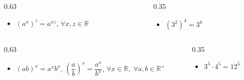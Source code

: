 \documentclass[aspectratio=169]{beamer}
\begin{document}
\begin{frame}[t]
  \vspace{0.14cm}
  \begin{columns}[T,onlytextwidth]
    \begin{column}{0.63\textwidth}
      \begin{minipage}[t][1.75em]{\columnwidth}
        \begin{itemize}
          \item<4-> \((a^x)^z=a^{xz}\), \quad \(\forall x,z\in\mathbb{R}\)
        \end{itemize}
      \end{minipage}
    \end{column}
    \begin{column}{0.35\textwidth}
      \begin{minipage}[c][1.75em]{\columnwidth}
        \begin{itemize}
          \item<5-> \((3^2)^4=3^8\)
        \end{itemize}
      \end{minipage}
    \end{column}
  \end{columns}

  \vspace{0.14cm}
  \begin{columns}[T,onlytextwidth]
    \begin{column}{0.63\textwidth}
      \begin{minipage}[t][4.65em]{\columnwidth}
        \vspace{0.45em}
        \begin{itemize}
          \item<6-> \((ab)^x=a^x b^x\), \quad \(\left(\dfrac{a}{b}\right)^x=\dfrac{a^x}{b^x}\), \quad \(\forall x\in\mathbb{R},\;\forall a,b\in\mathbb{R}^+\)
        \end{itemize}
      \end{minipage}
    \end{column}
    \begin{column}{0.35\textwidth}
      \begin{minipage}[c][4.65em]{\columnwidth}
        \begin{itemize}
          \item<7-> \(3^5\cdot 4^5=12^5\)
        \end{itemize}
      \end{minipage}
    \end{column}
  \end{columns}


\end{frame}
\end{document}
